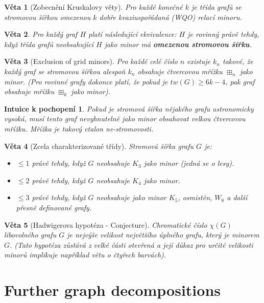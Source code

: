 \documentclass[a4paper,11pt]{article}
\newtheorem{theorem}{Věta}[section]
\newtheorem*{intuition}{Intuice k pochopení}
\begin{document}
\begin{theorem}[Zobecnění Kruskalovy věty]
Pro každé konečné $k$ je třída grafů se stromovou šířkou omezenou $k$ dobře kvaziuspořádaná (WQO) relací minoru.
\end{theorem}

\begin{theorem}
Pro každý graf $H$ platí následující ekvivalence: $H$ je rovinný právě tehdy, když třída grafů neobsahující $H$ jako minor má \textbf{omezenou stromovou šířku}.
\end{theorem}

\begin{theorem}[Exclusion of grid minors]
Pro každé celé číslo $n$ existuje $k_n$ takové, že každý graf se stromovou šířkou alespoň $k_n$ obsahuje čtvercovou mřížku $\boxplus_n$ jako minor. (Pro rovinné grafy dokonce platí, že pokud je $tw(G) \ge 6k - 4$, pak graf obsahuje mřížku $\boxplus_k$ jako minor).
\end{theorem}

\begin{intuition}
Pokud je stromová šířka nějakého grafu astronomicky vysoká, musí tento graf nevyhnutelně jako minor obsahovat velkou čtvercovou mřížku. Mřížka je takový etalon ne-stromovosti. 
\end{intuition}

\begin{theorem}[Zcela charakterizované třídy]
Stromová šířka grafu $G$ je:
\begin{itemize}
    \item $\le 1$ právě tehdy, když $G$ neobsahuje $K_3$ jako minor (jedná se o lesy).
    \item $\le 2$ právě tehdy, když $G$ neobsahuje $K_4$ jako minor.
    \item $\le 3$ právě tehdy, když $G$ neobsahuje jako minor $K_5$, osmistěn, $W_8$ a další přesně definované grafy.
\end{itemize}
\end{theorem}

\begin{theorem}[Hadwigerova hypotéza - Conjecture]
Chromatické číslo $\chi(G)$ libovolného grafu $G$ je nejvýše velikost největšího úplného grafu, který je minorem $G$. (Tato hypotéza zůstává z velké části otevřená a její důkaz pro určité velikosti minorů implikuje například větu o čtyřech barvách).
\end{theorem}

\section{Further graph decompositions}
\end{document}
